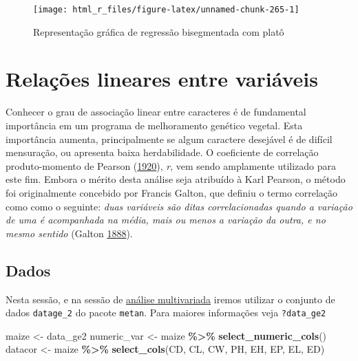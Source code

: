 \documentclass[
]{book}
\newenvironment{Shaded}{\begin{snugshade}}{\end{snugshade}}
\newcommand{\KeywordTok}[1]{\textcolor[rgb]{0.13,0.29,0.53}{\textbf{#1}}}
\newcommand{\NormalTok}[1]{#1}
\newcommand{\OperatorTok}[1]{\textcolor[rgb]{0.81,0.36,0.00}{\textbf{#1}}}
\newcommand{\StringTok}[1]{\textcolor[rgb]{0.31,0.60,0.02}{#1}}
\numberwithin{equation}{section}
\newcommand{\indt}[1]{\index{#1|ST}}
\begin{document}
\begin{figure}

{\centering \texttt{[image: html\_r\_files/figure-latex/unnamed-chunk-265-1]} 

}

\caption{Representação gráfica de regressão bisegmentada com platô}\label{fig:unnamed-chunk-265}
\end{figure}

\hypertarget{relations}{%
\chapter{Relações lineares entre variáveis}\label{relations}}

Conhecer o grau de associação linear entre caracteres é de fundamental importância em um programa de melhoramento genético vegetal. Esta importância aumenta, principalmente se algum caractere desejável é de difícil mensuração, ou apresenta baixa herdabilidade. O coeficiente de correlação \indt{correlação} produto-momento de Pearson (\protect\hyperlink{ref-Pearson1920}{1920}), \emph{r}, vem sendo amplamente utilizado para este fim. Embora o mérito desta análise seja atribuído à Karl Pearson, o método foi originalmente concebido por Francis Galton, que definiu o termo correlação como como o seguinte: \emph{duas variáveis são ditas correlacionadas quando a variação de uma é acompanhada na média, mais ou menos a variação da outra, e no mesmo sentido} (Galton \protect\hyperlink{ref-Galton1888}{1888}).

\hypertarget{dados}{%
\section{Dados}\label{dados}}

Nesta sessão, e na sessão de \protect\hyperlink{multivariate}{análise multivariada} iremos utilizar o conjunto de dados \texttt{datage\_2} do pacote \texttt{metan}. Para maiores informações veja \texttt{?data\_ge2}

\begin{Shaded}
\begin{Highlighting}[]
\NormalTok{maize \textless{}{-}}\StringTok{ }\NormalTok{data\_ge2}
\NormalTok{numeric\_var \textless{}{-}}\StringTok{ }\NormalTok{maize }\OperatorTok{\%\textgreater{}\%}\StringTok{ }\KeywordTok{select\_numeric\_cols}\NormalTok{()}
\NormalTok{datacor \textless{}{-}}\StringTok{ }\NormalTok{maize }\OperatorTok{\%\textgreater{}\%}\StringTok{ }\KeywordTok{select\_cols}\NormalTok{(CD, CL, CW, PH, EH, EP, EL, ED)}
\end{Highlighting}
\end{Shaded}
\end{document}
